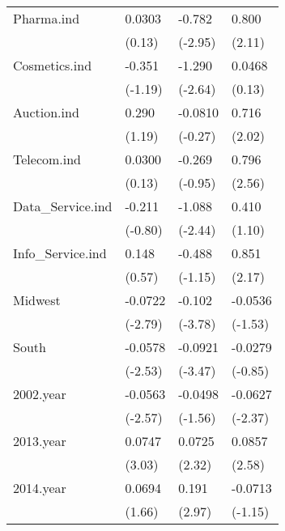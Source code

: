 \begin{longtable}{p{3 cm} p{2 cm} p{2 cm} p{2 cm}}
Pharma.ind  &   0.0303         &   -0.782\sym{**} &    0.800\sym{*}  \\
          &   (0.13)         &  (-2.95)         &   (2.11)         \\

Cosmetics.ind  &   -0.351         &   -1.290\sym{**} &   0.0468         \\
          &  (-1.19)         &  (-2.64)         &   (0.13)         \\

Auction.ind  &    0.290         &  -0.0810         &    0.716\sym{*}  \\
          &   (1.19)         &  (-0.27)         &   (2.02)         \\

Telecom.ind  &   0.0300         &   -0.269         &    0.796\sym{*}  \\
          &   (0.13)         &  (-0.95)         &   (2.56)         \\

Data\_Service.ind  &   -0.211         &   -1.088\sym{*}  &    0.410         \\
          &  (-0.80)         &  (-2.44)         &   (1.10)         \\

Info\_Service.ind  &    0.148         &   -0.488         &    0.851\sym{*}  \\
          &   (0.57)         &  (-1.15)         &   (2.17)         \\
Midwest  &  -0.0722\sym{**} &   -0.102\sym{***}&  -0.0536         \\
          &  (-2.79)         &  (-3.78)         &  (-1.53)         \\

South  &  -0.0578\sym{*}  &  -0.0921\sym{***}&  -0.0279         \\
          &  (-2.53)         &  (-3.47)         &  (-0.85)         \\

2002.year &  -0.0563\sym{*}  &  -0.0498         &  -0.0627\sym{*}  \\
          &  (-2.57)         &  (-1.56)         &  (-2.37)         \\

2013.year &   0.0747\sym{**} &   0.0725\sym{*}  &   0.0857\sym{**} \\
          &   (3.03)         &   (2.32)         &   (2.58)         \\

2014.year &   0.0694  &    0.191\sym{**} &  -0.0713    \\
          &   (1.66)         &   (2.97)         &  (-1.15)         \\


\end{longtable}

